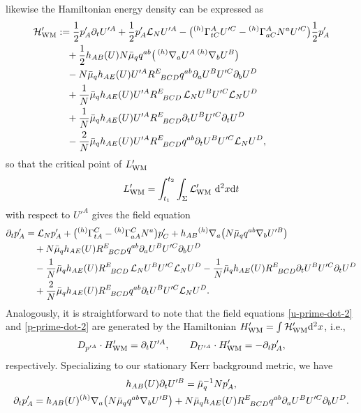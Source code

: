 \documentclass[11pt]{article}
\numberwithin{equation}{section}
\def\ptl{\partial}%
\def\grad{{\nabla}}%
\newcommand{\leftexp}[2]{{\vphantom{#2}}^{#1}{#2}}
\def\halb{\frac{1}{2}}%
\numberwithin{equation}{section}
\begin{document}
likewise the Hamiltonian energy density can be expressed as
\begin{align*}
\mathcal{H}'_{{\rm WM}}
& := \halb p'_A \ptl_t U'^A + \halb p'_A \mathcal{L}_N U'^A -\bigl(\leftexp{(h)}{\Gamma}^A_{tC} U'^C - \leftexp{(h)}{\Gamma}^A_{a C} N^a U'^C \bigr)\halb p'_A \notag\\
&\quad{}+\halb h_{AB}(U) N \bar{\mu}_q q^{ab} \bigl(\,\leftexp{(h)}{\grad}_a U^A \, \leftexp{(h)}{\grad}_b U^B \bigr) \notag\\
&\quad{} - N \bar{\mu}_q h_{AE}(U) U'^A R^E_{\,\,\,\,BCD} q^{a b} \ptl_a U^B U'^C \ptl_b U^D \notag\\
&\quad{} +\frac{1}{N} \bar{\mu}_q h_{AE}(U) U'^A R^E_{\,\,\,\,BCD} \, \mathcal{L}_N U^B U'^C \mathcal{L}_N U^D \notag\\
&\quad{} + \frac{1}{N} \bar{\mu}_q h_{AE}(U) U'^A R^E_{\,\,\,\,BCD} \ptl_t U^B U'^C \ptl_t U^D \notag\\
&\quad{} - \frac{2}{N}\bar{\mu}_q h_{AE}(U) U'^A R^E_{\,\,\,\,BCD} q^{a b} \ptl_t U^B U'^C \mathcal{L}_N U^D,
\end{align*}
so that the critical point of $L'_{{\rm WM}}$
\begin{align*}
L'_{{\rm WM}} = \int^{t_2}_{t_1} \int_{\Sigma} \mathcal{L}'_{{\rm WM}} \,\, {\rm d}^2x {\rm d}t
\end{align*}
with respect to $U'^A$ gives the field equation
\begin{align}
\ptl_t p'_A &{}= \mathcal{L}_N p'_A + \bigl(\leftexp{(h)}{\Gamma} ^C_{tA} - \leftexp{(h)}{\Gamma}^C_{aA} N^a\bigr)p'_C + h_{AB} \leftexp{(h)}{\grad}_a \bigl(N \bar{\mu}_q q^{ab} \grad_b U'^B\bigr) \notag\\
&\quad{} + N \bar{\mu}_q h_{AE}(U) R^E_{\,\,\,\,BCD} q^{a b} \ptl_a U^B U'^C \ptl_b U^D \notag\\
&\quad{} -\frac{1}{N} \bar{\mu}_q h_{AE}(U) R^E_{\,\,\,\,BCD} \, \mathcal{L}_N U^B U'^C \mathcal{L}_N U^D
 - \frac{1}{N} \bar{\mu}_q h_{AE}(U) R^E_{\,\,\,\,BCD} \ptl_t U^B U'^C \ptl_t U^D \notag\\
&\quad{} + \frac{2}{N}\bar{\mu}_q h_{AE}(U) R^E_{\,\,\,\,BCD} q^{a b} \ptl_t U^B U'^C \mathcal{L}_N U^D.\label{p-prime-dot-2}
\end{align}
Analogously, it is straightforward to note that the field equations \eqref{u-prime-dot-2} and \eqref{p-prime-dot-2} are generated by the Hamiltonian $H'_{{\rm WM}} = \int \mathcal{H}'_{{\rm WM}} {\rm d}^2 x$, i.e.,
\begin{align*}
D_{p'^A} \cdot H'_{{\rm WM}} = \ptl_t U'^A, \qquad D_{U'^A} \cdot H'_{{\rm WM}} = - \ptl_t p'_A,
\end{align*}
respectively. Specializing to our stationary Kerr background metric, we have
\begin{gather*}
 h_{AB}(U) \ptl_t U'^B= \bar{\mu}^{-1}_q N p'_A, \\
\ptl_t p'_A = h_{AB} (U) \leftexp{(h)}{\grad}_a \bigl(N \bar{\mu}_q q^{ab} \grad_b U'^B\bigr) + N \bar{\mu}_q h_{AE}(U) R^E_{\,\,\,\,BCD} q^{a b} \ptl_a U^B U'^C \ptl_b U^D.
\end{gather*}
\end{document}
